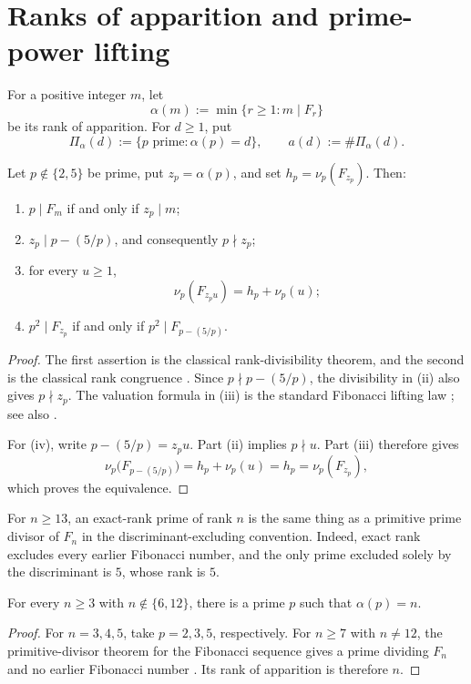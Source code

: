 \section{Ranks of apparition and prime-power lifting}
\label{sec:rank-lifting}

For a positive integer $m$, let
\[
 \alpha(m):=\min\{r\geq1:m\mid F_r\}
\]
be its rank of apparition.  For $d\geq1$, put
\[
 \Pi_\alpha(d):=\{p\text{ prime}:\alpha(p)=d\},
 \qquad a(d):=\#\Pi_\alpha(d).
\]

\begin{proposition}
\label{prop:rank-lifting}
Let $p\notin\{2,5\}$ be prime, put $z_p=\alpha(p)$, and set
$h_p=\nu_p(F_{z_p})$.  Then:
\begin{enumerate}[label=\textup{(\roman*)}]
\item $p\mid F_m$ if and only if $z_p\mid m$;
\item $z_p\mid p-(5/p)$, and consequently $p\nmid z_p$;
\item for every $u\geq1$,
\[
 \nu_p(F_{z_pu})=h_p+\nu_p(u);
\]
\item $p^2\mid F_{z_p}$ if and only if
$p^2\mid F_{p-(5/p)}$.
\end{enumerate}
\end{proposition}

\begin{proof}
The first assertion is the classical rank-divisibility theorem, and the
second is the classical rank congruence
\cite{Wall1960FibonacciModm,Vinson1963RankApparition}.  Since
$p\nmid p-(5/p)$, the divisibility in (ii) also gives $p\nmid z_p$.
The valuation formula in (iii) is the standard Fibonacci lifting law
\cite[Theorems~1 and~2]{Lengyel1995OrderFibonacciLucas}; see also
\cite{MedinaRowland2015PRegularity}.

For (iv), write $p-(5/p)=z_pu$.  Part (ii) implies $p\nmid u$.
Part (iii) therefore gives
\[
 \nu_p\bigl(F_{p-(5/p)}\bigr)
 =h_p+\nu_p(u)=h_p=\nu_p(F_{z_p}),
\]
which proves the equivalence.
\end{proof}

For $n\geq13$, an exact-rank prime of rank $n$ is the same thing as a
primitive prime divisor of $F_n$ in the discriminant-excluding convention.
Indeed, exact rank excludes every earlier Fibonacci number, and the only
prime excluded solely by the discriminant is $5$, whose rank is $5$.

\begin{theorem}
\label{thm:exact-rank-existence}
For every $n\geq3$ with $n\notin\{6,12\}$, there is a prime $p$ such that
$\alpha(p)=n$.
\end{theorem}

\begin{proof}
For $n=3,4,5$, take $p=2,3,5$, respectively.  For $n\geq7$ with
$n\neq12$, the primitive-divisor theorem for the Fibonacci sequence gives
a prime dividing $F_n$ and no earlier Fibonacci number
\cite{Carmichael1913PrimitiveDivisors,Yabuta2001PrimitiveDivisorFibonacci,
BiluHanrotVoutier2001PrimitiveDivisorsLucas}.  Its rank of apparition is
therefore $n$.
\end{proof}
